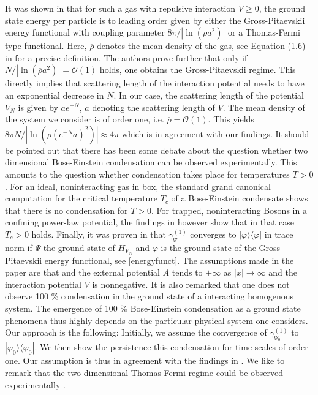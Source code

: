 \documentclass[11pt, english, american]{article}
\renewcommand{\phi}{\varphi}
\begin{document}
It was shown in \cite{lsy} that for such a gas with repulsive interaction $V \geq 0$, the ground state energy per particle is to leading order given by either the Gross-Pitaevskii energy functional with coupling parameter $ 8 \pi /| \ln( \overline{\rho} a^ 2 )|$ or a Thomas-Fermi type functional. Here, $\overline{\rho}$ denotes the mean density of the gas, see Equation (1.6) in \cite{lsy} for a precise definition. 
The authors prove further that only if $ N/ |\ln( \overline{\rho} a^ 2 )| =\mathcal{O}(1)$ holds, one obtains the Gross-Pitaevskii regime. This directly implies that scattering length of the interaction potential needs to have an exponential decrease in $N$. In our case, the scattering length of the potential $V_N$ is given by  $ae^{-N}$, $a$ denoting the scattering length of $V$. The mean density of the system we consider is of order one, i.e. $\overline{\rho} = \mathcal{O}(1)$. 
This yields 
$8 \pi N/ |\ln( \overline{\rho} (e^{-N}a)^ 2 )| \approx 4 \pi $ which is in agreement with our findings.
It should be pointed out that there has been some debate about the question whether two dimensional Bose-Einstein condensation can be observed experimentally. This amounts to the question whether condensation takes place for temperatures $T>0$. For an ideal, noninteracting gas in box, the standard grand canonical computation for the critical temperature $T_c$ of a Bose-Einstein condensate shows that there is no condensation for $T>0$. For trapped, noninteracting Bosons in a confining power-law potential, the findings in \cite{Bagnato} however show that in that case $T_c>0$ holds. 
Finally, it was proven in \cite{lieb100bec} that $\gamma^{(1)}_{\Psi}$ converges
 to $ |\phi\rangle\langle\phi|$ in trace norm if $\Psi$ the ground state of $H_{V_N}$
and $\phi$ is the ground state of the Gross-Pitaevskii energy functional, see \eqref{energyfunct}.
The assumptions made in the paper are that  and the external potential $A$ tends to $+ \infty$ as $ |x| \rightarrow \infty$ and the interaction potential $V$ is nonnegative. It is also remarked that one does not observe 100 \% condensation in the ground state of a interacting homogenous system.
The emergence of 100 \% Bose-Einstein condensation as a ground state phenomena thus highly depends on the particular physical system one considers. 
Our approach is the following: Initially, we assume the convergence of $\gamma^{(1)}_{\Psi_0}$ 
 to $ |\phi_0\rangle\langle\phi_0|$. We then show the persistence this condensation for time scales of order one. Our assumption is thus in agreement with the findings in \cite{lieb100bec}.
 We like to remark that the two dimensional Thomas-Fermi regime could be observed experimentally \cite{experiment}.
\end{document}
